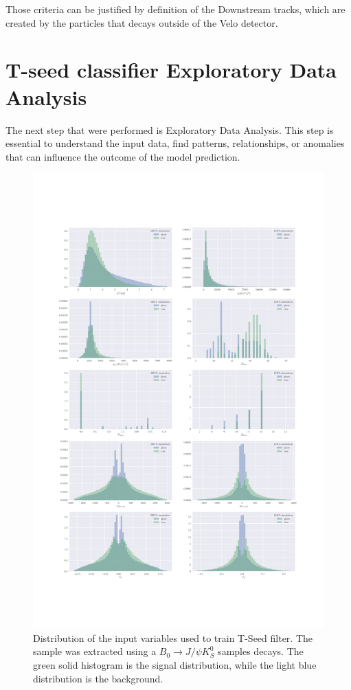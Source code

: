 Those criteria can be justified by definition of the Downstream tracks, which are created by the particles that decays outside of the Velo detector. 

\section{T-seed classifier Exploratory Data Analysis}

The next step that were performed is Exploratory Data Analysis. This step is essential to understand the input data, find patterns, relationships, or anomalies that can influence the outcome of the model prediction.   

\begin{figure}
\centering
\includegraphics{figures/features.pdf}
\caption{Distribution of the input variables used to train T-Seed filter. The sample was extracted using a $B_0\rightarrow J/\psi K_S^0 $ samples decays. The green solid histogram is the signal distribution, while the light blue
distribution is the background.
\label{fig:input features}}
\end{figure}

